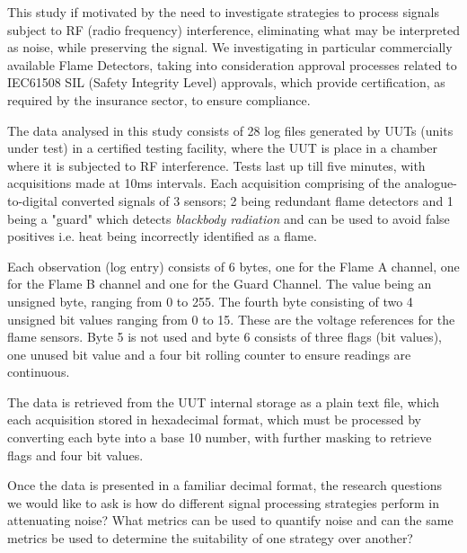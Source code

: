 
This study if motivated by the need to investigate strategies to process signals subject to RF (radio frequency) interference, eliminating what may be interpreted as noise, while preserving the signal. We investigating in particular commercially available Flame Detectors, taking into consideration approval processes related to IEC61508 \cite{wiki:IEC61508} SIL (Safety Integrity Level) approvals, which provide certification, as required by the insurance sector, to ensure compliance.

The data analysed in this study consists of 28 log files generated by UUTs (units under test) in a certified testing facility, where the UUT is place in a chamber where it is subjected to RF interference. Tests last up till five minutes, with acquisitions made at 10ms intervals. Each acquisition comprising of the analogue-to-digital converted signals of 3 sensors; 2 being redundant flame detectors and 1 being a "guard" which detects \textit{blackbody radiation} \cite{Massoud:2005} and can be used to avoid false positives i.e. heat being incorrectly identified as a flame.

Each observation (log entry) consists of 6 bytes, one for the Flame A channel, one for the Flame B channel and one for the Guard Channel. The value being an unsigned byte, ranging from 0 to 255. The fourth byte consisting of two 4 unsigned bit values ranging from 0 to 15. These are the voltage references for the flame sensors. Byte 5 is not used and byte 6 consists of three flags (bit values), one unused bit value and a four bit rolling counter to ensure readings are continuous. 

The data is retrieved from the UUT internal storage as a plain text file, which each acquisition stored in hexadecimal format, which must be processed by converting each byte into a base 10 number, with further masking to retrieve flags and four bit values.

Once the data is presented in a familiar decimal format, the research questions we would like to ask is how do different signal processing strategies perform in attenuating noise? What metrics can be used to quantify noise and can the same metrics be used to determine the suitability of one strategy over another?
